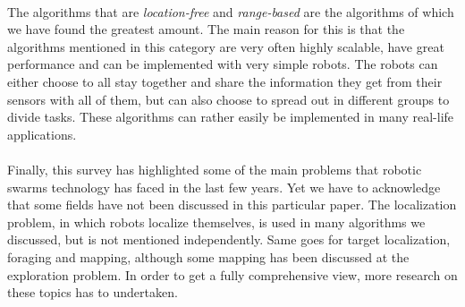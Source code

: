 \\
The algorithms that are \emph{location-free} and \emph{range-based} are the algorithms of which we have found the greatest amount. The main reason for this is that the algorithms mentioned in this category are very often highly scalable, have great performance and can be implemented with very simple robots. The robots can either choose to all stay together and share the information they get from their sensors with all of them, but can also choose to spread out in different groups to divide tasks. These algorithms can rather easily be implemented in many real-life applications.\\
\\
Finally, this survey has highlighted some of the main problems that robotic swarms technology has faced in the last few years. Yet we have to acknowledge that some fields have not been discussed in this particular paper. The localization problem, in which robots localize themselves, is used in many algorithms we discussed, but is not mentioned independently. Same goes for target localization, foraging and mapping, although some mapping has been discussed at the exploration problem. In order to get a fully comprehensive view, more research on these topics has to undertaken.

